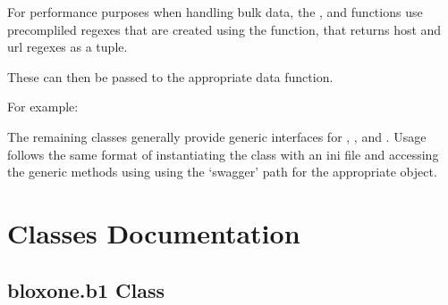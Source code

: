 \documentclass[letterpaper,10pt,english]{sphinxmanual}
\begin{document}
\sphinxAtStartPar
For performance purposes when handling bulk data, the ,
 and  functions use pre\sphinxhyphen{}compliled
regexes that are created using the  function, that returns
host and url regexes as a tuple.

\sphinxAtStartPar
These can then be passed to the appropriate data function.

\sphinxAtStartPar
For example:

\begin{sphinxVerbatim}[commandchars=\\\{\}]
 
   
  
    
  
    
\end{sphinxVerbatim}

\sphinxAtStartPar
The remaining classes generally provide generic interfaces for , ,  and .
Usage follows the same format of instantiating the class with an ini file and accessing the generic methods
using using the ‘swagger’ path for the appropriate object.


\chapter{Classes Documentation}
\label{\detokenize{classes:classes-documentation}}\label{\detokenize{classes::doc}}

\section{bloxone.b1 Class}
\label{\detokenize{bloxone-class:bloxone-b1-class}}\label{\detokenize{bloxone-class::doc}}
\end{document}
